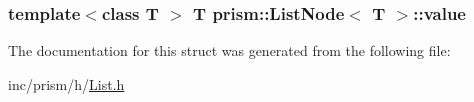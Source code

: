 \subsubsection[{\texorpdfstring{value}{value}}]{\setlength{\rightskip}{0pt plus 5cm}template$<$class T $>$ T {\bf prism\+::\+List\+Node}$<$ T $>$\+::value}\hypertarget{structprism_1_1_list_node_a7e32dda6d1af7a226aced3240b4ef42d}{}\label{structprism_1_1_list_node_a7e32dda6d1af7a226aced3240b4ef42d}


The documentation for this struct was generated from the following file\+:\begin{DoxyCompactItemize}
\item 
inc/prism/h/\hyperlink{_list_8h}{List.\+h}\end{DoxyCompactItemize}
